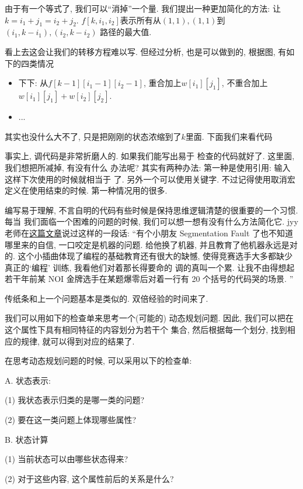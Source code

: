 由于有一个等式了, 我们可以``消掉''一个量. 我们提出一种更加简化的方法:
让$k=i_1+j_1=i_2+j_2$.  
$f[k, i_1, i_2]$表示所有从$(1,1), (1,1)$到$(i_1, k-i_1), (i_2, k-i_2)$
路径的最大值. 

看上去这会让我们的转移方程难以写. 但经过分析, 也是可以做到的, 根据图, 有如下的四类情况
\begin{itemize}
    \item 下下: 从$f[k-1][i_1-1][i_2-1]$, 重合加上$w[i_1][j_1]$, 不重合加上$w[i_1][j_1]+w[i_2][j_2]$.
    \item ...
\end{itemize}

其实也没什么大不了, 只是把刚刚的状态浓缩到了$k$里面. 下面我们来看代码 

 事实上, 调代码是非常折磨人的. 如果我们能写出易于
检查的代码就好了. 这里面, 我们想把所减掉, 有没有什么
办法呢? 其实有两种办法: 第一种是使用引用: 输入
 这样下次使用的时候就相当于
了. 另外一个可以使用关键字. 
不过记得使用取消宏定义在使用结束的时候. 第一种情况用的很多. 

\begin{remark}
    编写易于理解, 不言自明的代码有些时候是保持思维逻辑清楚的很重要的一个习惯. 每当
    我们面临一个困难的问题的时候, 我们可以想一想有没有什么方法简化它. jyy
    老师在\href{https://zhuanlan.zhihu.com/p/619237809}{这篇文章}说过这样的一段话: 
    ``有个小朋友 Segmentation Fault 了也不知道哪里来的自信, 
    一口咬定是机器的问题. 给他换了机器, 并且教育了他机器永远是对的. 
    这个小插曲体现了编程的基础教育还有很大的缺憾, 使得竞赛选手大多都缺少真正的`编程' 训练,
    我看他们对着那长得要命的  
    调的真叫一个累. 让我不由得想起若干年前某 NOI 金牌选手在某题爆零后对着一行有 20 
    个括号的代码哭的场景. '' 
\end{remark}


 传纸条和上一个问题基本是类似的. 双倍经验的时间来了. 


 我们可以用如下的检查单来思考一个(可能的)
动态规划问题. 因此, 我们可以把在这个属性下具有相同特征的内容划分为若干个
集合, 然后根据每一个划分, 找到相应的规律, 就可以得到对应的结果了. 

\begin{theorem}
    在思考动态规划问题的时候, 可以采用以下的检查单: 
    
    A. 状态表示:

        (1) 我状态表示归类的是哪一类的问题? 

        (2) 要在这一类问题上体现哪些属性? 

    B. 状态计算

        (1) 当前状态可以由哪些状态得来?

        (2) 对于这些内容, 这个属性前后的关系是什么? 
    
\end{theorem}

